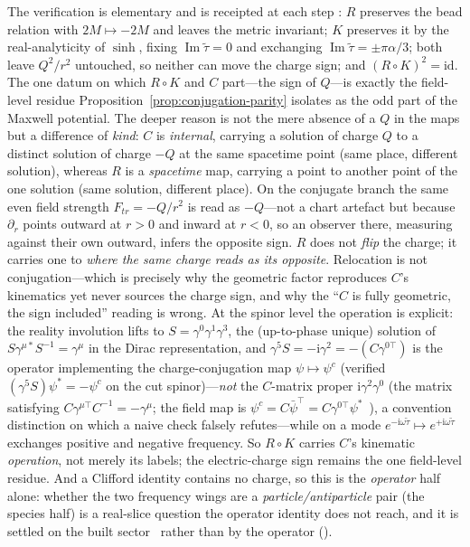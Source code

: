 \documentclass[11pt]{article}
\theoremstyle{plain}
\theoremstyle{remark}
\begin{document}
The verification is elementary and is receipted at each step : $R$ preserves the bead relation with $2M\mapsto-2M$ and leaves the metric invariant; $K$ preserves it by the real-analyticity of $\sinh$, fixing $\operatorname{Im}\tilde\tau=0$ and exchanging $\operatorname{Im}\tilde\tau=\pm\pi\alpha/3$; both leave $Q^{2}/r^{2}$ untouched, so neither can move the charge sign; and $(R\circ K)^{2}=\mathrm{id}$. The one datum on which $R\circ K$ and $C$ part---the sign of $Q$---is exactly the field-level residue Proposition~\ref{prop:conjugation-parity} isolates as the odd part of the Maxwell potential. The deeper reason is not the mere absence of a $Q$ in the maps but a difference of \emph{kind}: $C$ is \emph{internal}, carrying a solution of charge $Q$ to a distinct solution of charge $-Q$ at the same spacetime point (same place, different solution), whereas $R$ is a \emph{spacetime} map, carrying a point to another point of the one solution (same solution, different place). On the conjugate branch the same even field strength $F_{tr}=-Q/r^{2}$ is read as $-Q$---not a chart artefact but because $\partial_{r}$ points outward at $r>0$ and inward at $r<0$, so an observer there, measuring against their own outward, infers the opposite sign. $R$ does not \emph{flip} the charge; it carries one to \emph{where the same charge reads as its opposite}. Relocation is not conjugation---which is precisely why the geometric factor reproduces $C$'s kinematics yet never sources the charge sign, and why the ``$C$ is fully geometric, the sign included'' reading is wrong. At the spinor level the operation is explicit: the reality involution lifts to $S=\gamma^{0}\gamma^{1}\gamma^{3}$, the (up-to-phase unique) solution of $S\gamma^{\mu*}S^{-1}=\gamma^{\mu}$ in the Dirac representation, and $\gamma^{5}S=-\mathrm{i}\gamma^{2}=-(C\gamma^{0\top})$ is the operator implementing the charge-conjugation map $\psi\mapsto\psi^{c}$ (verified $(\gamma^{5}S)\psi^{*}=-\psi^{c}$ on the cut spinor)---\emph{not} the $C$-matrix proper $\mathrm{i}\gamma^{2}\gamma^{0}$ (the matrix satisfying $C\gamma^{\mu\top}C^{-1}=-\gamma^{\mu}$; the field map is $\psi^{c}=C\bar\psi^{\top}=C\gamma^{0\top}\psi^{*}$~\cite{PeskinSchroeder}), a convention distinction on which a naive check falsely refutes---while on a mode $e^{-\mathrm{i}\omega\tilde\tau}\mapsto e^{+\mathrm{i}\omega\tilde\tau}$ exchanges positive and negative frequency. So $R\circ K$ carries $C$'s kinematic \emph{operation}, not merely its labels; the electric-charge sign remains the one field-level residue. And a Clifford identity contains no charge, so this is the \emph{operator} half alone: whether the two frequency wings are a \emph{particle/antiparticle} pair (the species half) is a real-slice question the operator identity does not reach, and it is settled on the built sector~\cite{JanzenMatter} rather than by the operator ().
\end{document}
